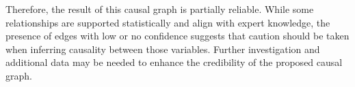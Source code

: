 \documentclass{article}
\begin{document}
Therefore, the result of this causal graph is partially reliable. While some relationships are supported statistically and align with expert knowledge, the presence of edges with low or no confidence suggests that caution should be taken when inferring causality between those variables. Further investigation and additional data may be needed to enhance the credibility of the proposed causal graph.
\end{document}

